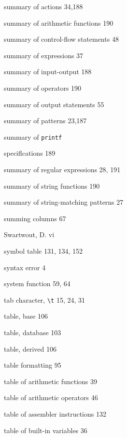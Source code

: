 \begin{multicols}{3}
\hangindent=4pc  summary of actions 34,188

\hangindent=4pc  summary of arithmetic functions 190

\hangindent=4pc  summary of control-flow statements 48

\hangindent=4pc  summary of expressions 37

\hangindent=4pc  summary of input-output 188

\hangindent=4pc  summary of operators 190

\hangindent=4pc  summary of output statements 55

\hangindent=4pc  summary of patterns 23,187

\hangindent=4pc  summary of \verb'printf'

\hangindent=4pc  speciflcations 189

\hangindent=4pc  summary of regular expressions 28, 191

\hangindent=4pc  summary of string functions 190

\hangindent=4pc  summary of string-matching patterns 27

\hangindent=4pc  summing columns 67

\hangindent=4pc  Swartwout, D. vi

\hangindent=4pc  symbol table 131, 134, 152

\hangindent=4pc  syntax error 4

\hangindent=4pc  system function 59, 64

\hangindent=4pc  tab character, \verb'\t' 15, 24, 31

\hangindent=4pc  table, base 106

\hangindent=4pc  table, database 103

\hangindent=4pc  table, derived 106

\hangindent=4pc  table formatting 95

\hangindent=4pc  table of arithmetic functions 39

\hangindent=4pc  table of arithmetic operators 46

\hangindent=4pc  table of assembler instructions 132

\hangindent=4pc  table of built-in variables 36


\end{multicols}
